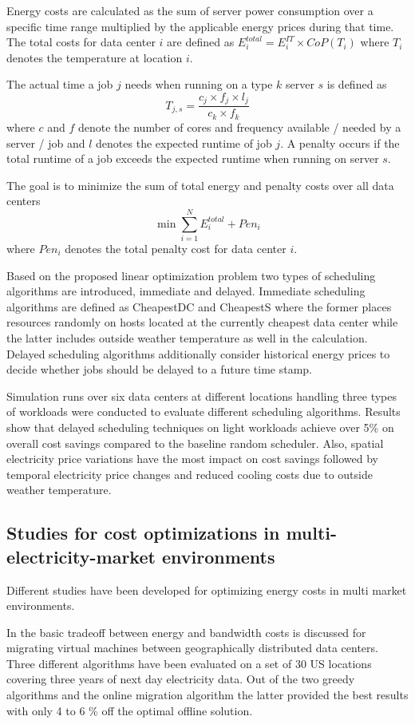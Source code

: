 Energy costs are calculated as the sum of server power consumption over a specific time range multiplied by the applicable energy prices during that time. 
The total costs for data center $i$ are defined as $E_{i}^{total} = E_{i}^{IT} \times CoP(T_i)$ where $T_i$ denotes the temperature at location $i$. 

The actual time a job $j$ needs when running on a type $k$ server $s$ is defined as 
\[  T_{j,s} = \frac{c_j \times f_j \times l_j}{c_k \times f_k}  \] 
where $c$ and $f$ denote the number of cores and frequency available / needed by a server / job and $l$ denotes the expected runtime of job $j$. 
A penalty occurs if the total runtime of a job exceeds the expected runtime when running on server $s$. 

The goal is to minimize the sum of total energy and penalty costs over all data centers 
\[ \min \sum_{i=1}^{N}{E_{i}^{total} + Pen_i} \]
where $Pen_i$ denotes the total penalty cost for data center $i$. 

Based on the proposed linear optimization problem two types of scheduling algorithms are introduced, immediate and delayed. Immediate scheduling algorithms are defined as CheapestDC and CheapestS where the former places resources randomly on hosts located at the currently cheapest data center while the latter includes outside weather temperature as well in the calculation. Delayed scheduling algorithms additionally consider historical energy prices to decide whether jobs should be delayed to a future time stamp. 

Simulation runs over six data centers at different locations handling three types of workloads were conducted to evaluate different scheduling algorithms.
Results show that delayed scheduling techniques on light workloads achieve over 5\% on overall cost savings compared to the baseline random scheduler. Also, spatial electricity price variations have the most impact on cost savings followed by temporal electricity price changes and reduced cooling costs due to outside weather temperature. 


\subsection{Studies for cost optimizations in multi-electricity-market environments}

Different studies have been developed for optimizing energy costs in multi market environments. 

In \cite{buchbinder2011online} the basic tradeoff between energy and bandwidth costs is discussed for migrating virtual machines between geographically distributed data centers. 
Three different algorithms have been evaluated on a set of 30 US locations covering three years of next day electricity data. Out of the two greedy algorithms and the online migration algorithm the latter provided the best results with only 4 to 6 \% off the optimal offline solution. 

